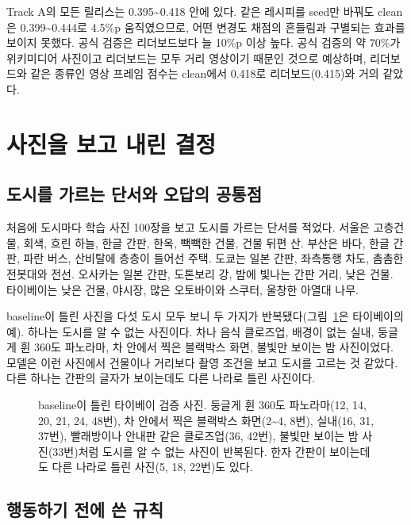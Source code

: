 \documentclass[11pt]{article}
\begin{document}
Track A의 모든 릴리스는 0.395\textasciitilde 0.418 안에 있다. 같은 레시피를 seed만 바꿔도 clean은 0.399\textasciitilde 0.444로 4.5\%p 움직였으므로, 어떤 변경도 채점의 흔들림과 구별되는 효과를 보이지 못했다. 공식 검증은 리더보드보다 늘 10\%p 이상 높다. 공식 검증의 약 70\%가 위키미디어 사진이고 리더보드는 모두 거리 영상이기 때문인 것으로 예상하며, 리더보드와 같은 종류인 영상 프레임 점수는 clean에서 0.418로 리더보드(0.415)와 거의 같았다.

\section*{사진을 보고 내린 결정}

\subsection*{도시를 가르는 단서와 오답의 공통점}

처음에 도시마다 학습 사진 100장을 보고 도시를 가르는 단서를 적었다. 서울은 고층건물, 회색, 흐린 하늘, 한글 간판, 한옥, 빽빽한 건물, 건물 뒤편 산. 부산은 바다, 한글 간판, 파란 버스, 산비탈에 층층이 들어선 주택. 도쿄는 일본 간판, 좌측통행 차도, 촘촘한 전봇대와 전선. 오사카는 일본 간판, 도톤보리 강, 밤에 빛나는 간판 거리, 낮은 건물. 타이베이는 낮은 건물, 야시장, 많은 오토바이와 스쿠터, 울창한 아열대 나무.

baseline이 틀린 사진을 다섯 도시 모두 보니 두 가지가 반복됐다(그림~\ref{fig:mistakes}은 타이베이의 예). 하나는 도시를 알 수 없는 사진이다. 차나 음식 클로즈업, 배경이 없는 실내, 둥글게 휜 360도 파노라마, 차 안에서 찍은 블랙박스 화면, 불빛만 보이는 밤 사진이었다. 모델은 이런 사진에서 건물이나 거리보다 촬영 조건을 보고 도시를 고르는 것 같았다. 다른 하나는 간판의 글자가 보이는데도 다른 나라로 틀린 사진이다.

\begin{figure}[H]\centering
{}
\caption{baseline이 틀린 타이베이 검증 사진. 둥글게 휜 360도 파노라마(12, 14, 20, 21, 24, 48번), 차 안에서 찍은 블랙박스 화면(2\textasciitilde 4, 8번), 실내(16, 31, 37번), 빨래방이나 안내판 같은 클로즈업(36, 42번), 불빛만 보이는 밤 사진(33번)처럼 도시를 알 수 없는 사진이 반복된다. 한자 간판이 보이는데도 다른 나라로 틀린 사진(5, 18, 22번)도 있다.}
\label{fig:mistakes}
\end{figure}

\subsection*{행동하기 전에 쓴 규칙}
\end{document}
